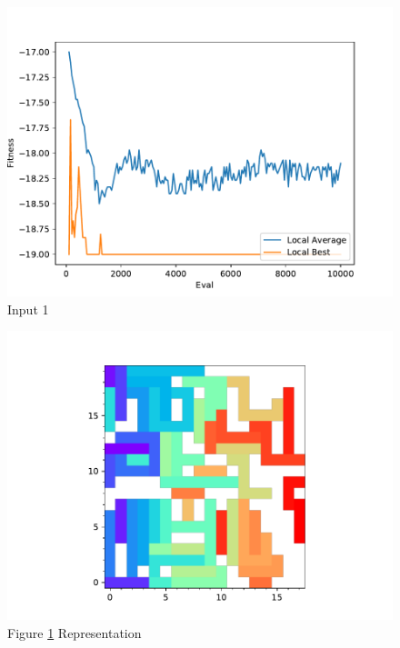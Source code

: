 \documentclass{standalone}
\begin{document}
\begin{figure}[!htb]
	\caption{Input 1}
	\label{fig:graph_1001}
	\includegraphics[width=\textwidth]{../graphs/graphs/1001.pdf}
\end{figure}


\begin{figure}[!htb]
	\caption{Figure \ref{fig:graph_1001} Representation}
	\label{fig:picture_1001}
	\includegraphics[width=\textwidth]{../graphs/picture/1001.pdf}
\end{figure}
\end{document}
